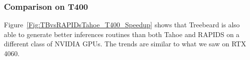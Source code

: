 \subsubsection*{Comparison on T400}
Figure~\ref{Fig:TBvsRAPIDsTahoe_T400_Speedup} shows that Treebeard{} is also able to generate better inferences routines than both Tahoe and RAPIDS on a different class of NVIDIA GPUs. The trends are similar to what we saw on RTX 4060.
